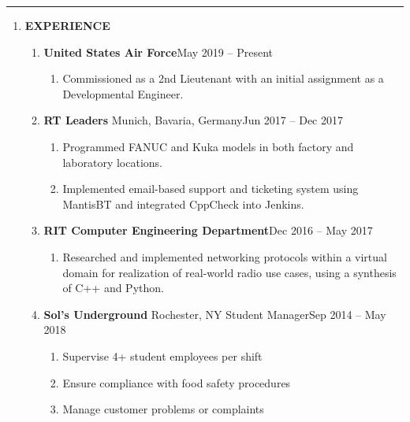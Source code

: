 \documentclass[11pt]{article}
\begin{document}
\textcolor{black!20}{\rule{\textwidth}{3pt}}
\begin{center}
\begin{enumerate}[label={}, leftmargin=0pt]
    \item {\Large \textbf{EXPERIENCE}}
    \begin{enumerate}[label={}]
        \item \textbf{United States Air Force}\hfill May 2019 -- Present
        \begin{enumerate}[label={--}]
            \item Commissioned as a 2nd Lieutenant with an initial assignment as a Developmental Engineer.
        \end{enumerate}
        \item \textbf{RT Leaders} \textbar{} Munich, Bavaria, Germany\hfill Jun 2017 -- Dec 2017
        \begin{enumerate}[label={--}]
            \item Programmed FANUC and Kuka models in both factory and laboratory locations.
            \item Implemented email-based support and ticketing system using MantisBT and integrated CppCheck into Jenkins.
        \end{enumerate}
        \item \textbf{RIT Computer Engineering Department}\hfill Dec 2016 -- May 2017
        \begin{enumerate}[label={--}]
            \item Researched and implemented networking protocols within a virtual domain for realization of real-world radio use cases, using a synthesis of C++ and Python.
        \end{enumerate}
        \item \textbf{Sol's Underground} \textbar{} Rochester, NY \textbar{} Student Manager\hfill Sep 2014 -- May 2018
        \begin{enumerate}[label={--}]
            \item Supervise 4+ student employees per shift
            \item Ensure compliance with food safety procedures
            \item Manage customer problems or complaints
        \end{enumerate}
    \end{enumerate}
\end{enumerate}
\end{center}
\end{document}
